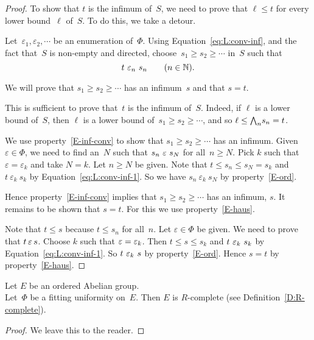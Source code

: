 \documentclass[main.tex]{subfiles}
\begin{document}
\begin{proof}
To show that $t$ is the infimum of~$S$,
we need to prove that $\ell \leq t$
for every lower bound~$\ell$ of~$S$.
To do this, we take a detour.

Let~$\varepsilon_1,\varepsilon_2,\dotsb$
be an enumeration of~$\Phi$.
Using Equation~\eqref{eq:L:conv-inf},
and the fact that~$S$ is non-empty and directed,
choose~$s_1 \geq s_2 \geq \dotsb$ in~$S$
such that 
\begin{equation}
\label{eq:L:conv-inf-1}
t\ \varepsilon_n \ s_n\qquad(n\in \mathbb{N}).
\end{equation}

We will prove that
$s_1 \geq s_2 \geq \dotsb$
has an infimum~$s$ and that $s=t$.

This is sufficient to prove that~$t$ is the infimum of~$S$.
Indeed,
if $\ell$ is a lower bound of~$S$,
then $\ell$ is a lower bound of~$s_1 \geq s_2 \geq\dotsb$,
and so $\ell \leq \textstyle{\bigwedge}_n s_n =t$.

We use property~\ref{E-inf-conv}
to show that $s_1 \geq s_2 \geq\dotsb$
has an infimum.
Given $\varepsilon\in\Phi$,
we need to find an~$N$ such that $s_n \ \varepsilon\ s_N$
for all~$n\geq N$. Pick $k$ such that $\varepsilon=\varepsilon_k$
and take $N=k$. Let $n\geq N$ be given.
Note that $t \leq s_n \leq s_N =s_k$
and $t\ \varepsilon_k\ s_k$
by Equation~\eqref{eq:L:conv-inf-1}.
So we have $s_n\ \varepsilon_k\ s_N$ by property~\ref{E-ord}.

Hence property~\ref{E-inf-conv} implies that $s_1 \geq s_2 \geq \dotsb$
has an infimum, $s$.
It remains to be shown that $s=t$.
For this we use property~\ref{E-haus}.

Note that $t\leq s$ because $t\leq s_n$ for all~$n$.
Let $\varepsilon\in\Phi$ be given.
We need to prove that $t \,\varepsilon\, s$.
Choose $k$ such that $\varepsilon = \varepsilon_k$.
Then $t \leq s \leq s_k$
and $t \ \varepsilon_k\ s_k$
by Equation~\eqref{eq:L:conv-inf-1}.
So $t\ \varepsilon_k \  s$ by property~\ref{E-ord}.
Hence $s=t$ by property~\ref{E-haus}.
\end{proof}
%
%
\begin{prop}
\label{P:fitting-R-complete}
Let $E$ be an ordered Abelian group.\\
Let~$\Phi$ be a fitting uniformity on~$E$.
Then $E$ is $R$-complete (see Definition~\ref{D:R-complete}).
\end{prop}
\begin{proof}
We leave this to the reader.
\end{proof}
%
%
\end{document}
